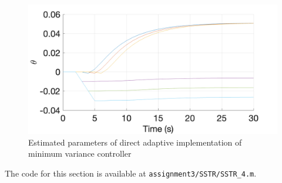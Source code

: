\begin{figure}
	\centering
	\includegraphics[width=\textwidth]{images/sstr43.png}
	\caption{Estimated parameters of direct adaptive implementation of minimum variance controller}
	\label{fig:sstr43}
\end{figure}

\noindent The code for this section is available at \lstinline|assignment3/SSTR/SSTR_4.m|. 
